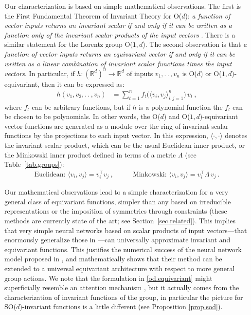 \documentclass{article}
\theoremstyle{Hogg}
\newcommand{\inner}[2]{\langle{#1},{#2}\rangle}
\renewcommand{\ldots}{.\,.\,}
\renewcommand{\cdots}{\ldots}
\begin{document}
Our characterization is based on simple mathematical observations. The first is the First Fundamental Theorem of Invariant Theory for O($d$): \emph{a function of vector inputs returns an invariant scalar if and only if it can be written as a function only of the invariant scalar products of the input vectors} \cite[Section~II.A.9]{weyl}. There is a similar statement for the Lorentz group O($1,d$). The second observation is that \emph{a function of vector inputs returns an equivariant vector if and only if it can be written as a linear combination of invariant scalar functions times the input vectors}.
 In particular, if $h:(\mathbb R^d)^n \to \mathbb R^d$ of inputs $v_1,\ldots,v_n$ is O($d$) or O($1,d$)-equivariant, then it can be expressed as:
\begin{align}
    h(v_1, v_2, \cdots, v_n) &= \sum_{t=1}^n f_t\Big(\inner{v_i}{v_j}_{i,j=1}^n\Big)\,v_t
    ~, \label{od.equivariant}
\end{align}
where $f_t$ can be arbitrary functions, but if $h$ is a polynomial function the $f_t$ can be chosen to be polynomials. In other words, the O($d$) and O($1,d$)-equivariant vector functions are generated as a module over the ring of invariant scalar functions by the projections to each input vector. In this expression, $\inner{\cdot}{\cdot}$ denotes the invariant scalar product, which can be the usual Euclidean inner product, or the Minkowski inner product defined in terms of a metric $\Lambda$ (see Table~\ref{tab.groups}): 
\begin{align} \label{eq.ip}
    \text{Euclidean: } \inner{v_i}{v_j}=v_i^\top v_j~, \quad & \quad \text{Minkowski: }\inner{v_i}{v_j} =v_i^\top \Lambda \,v_j ~.
\end{align}

Our mathematical observations lead to a simple characterization for a very general class of equivariant functions, simpler than any based on irreducible representations or the imposition of symmetries through constraints (these methods are currently state of the art; see Section~\ref{sec.related}).
This implies that very simple neural networks based on scalar products of input vectors---that enormously generalize those in \cite{enequivariant}---can universally approximate invariant and equivariant functions. This justifies the numerical success of the neural network model proposed in \cite{enequivariant}, and mathematically shows that their method can be extended to a universal equivariant architecture with respect to more general group actions. 
We note that the formulation in \eqref{od.equivariant} might superficially resemble an attention mechanism \cite{velivckovic2017graph}, but it actually comes from the characterization of invariant functions of the group, in particular the picture for SO($d$)-invariant functions is a little different (see Proposition \ref{prop.sod}). 
\end{document}
